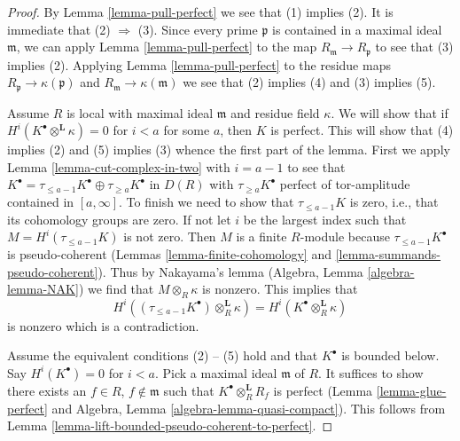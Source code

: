 \begin{proof}
By Lemma \ref{lemma-pull-perfect} we see that (1) implies (2).
It is immediate that (2) $\Rightarrow$ (3). Since every prime
$\mathfrak p$ is contained in a maximal ideal $\mathfrak m$,
we can apply Lemma \ref{lemma-pull-perfect} to the map
$R_\mathfrak m \to R_\mathfrak p$ to see that (3) implies (2).
Applying Lemma \ref{lemma-pull-perfect} to the residue maps
$R_\mathfrak p \to \kappa(\mathfrak p)$ and
$R_\mathfrak m \to \kappa(\mathfrak m)$ we see that (2) implies
(4) and (3) implies (5).

\medskip\noindent
Assume $R$ is local with maximal ideal $\mathfrak m$ and
residue field $\kappa$. We will show that if
$H^i(K^\bullet \otimes^\mathbf{L} \kappa) = 0$ for $i < a$
for some $a$, then $K$ is perfect. This will show that
(4) implies (2) and (5) implies (3) whence the first part
of the lemma. First we apply Lemma \ref{lemma-cut-complex-in-two}
with $i = a - 1$ to see that
$K^\bullet = \tau_{\leq a - 1}K^\bullet \oplus \tau_{\geq a}K^\bullet$
in $D(R)$ with $\tau_{\geq a}K^\bullet$ perfect of tor-amplitude
contained in $[a, \infty]$. To finish we need to show that
$\tau_{\leq a - 1}K$ is zero, i.e., that its cohomology groups are zero.
If not let $i$ be the largest index such that $M = H^i(\tau_{\leq a - 1}K)$
is not zero. Then $M$ is a finite $R$-module because
$\tau_{\leq a - 1}K^\bullet$ is pseudo-coherent
(Lemmas \ref{lemma-finite-cohomology} and \ref{lemma-summands-pseudo-coherent}).
Thus by Nakayama's lemma (Algebra, Lemma \ref{algebra-lemma-NAK})
we find that $M \otimes_R \kappa$ is nonzero.
This implies that
$$
H^i((\tau_{\leq a - 1}K^\bullet) \otimes_R^\mathbf{L} \kappa) =
H^i(K^\bullet \otimes_R^\mathbf{L} \kappa)
$$
is nonzero which is a contradiction.

\medskip\noindent
Assume the equivalent conditions (2) -- (5) hold and that
$K^\bullet$ is bounded below. Say $H^i(K^\bullet) = 0$ for
$i < a$. Pick a maximal ideal $\mathfrak m$ of $R$.
It suffices to show there exists an $f \in R$, $f \not \in \mathfrak m$
such that $K^\bullet \otimes_R^\mathbf{L} R_f$ is perfect
(Lemma \ref{lemma-glue-perfect} and
Algebra, Lemma \ref{algebra-lemma-quasi-compact}).
This follows from Lemma \ref{lemma-lift-bounded-pseudo-coherent-to-perfect}.
\end{proof}

